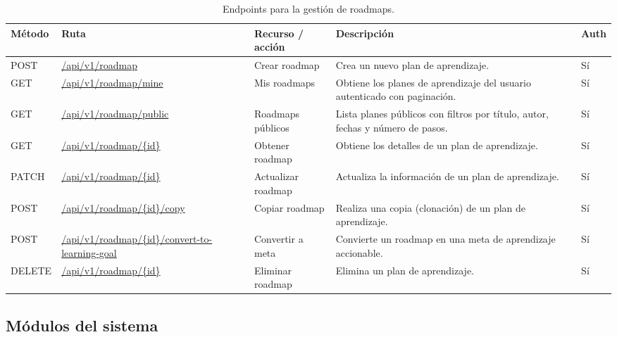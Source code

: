 \begin{table}[H]
\centering
\footnotesize
\setlength{\tabcolsep}{4pt}
\renewcommand{\arraystretch}{1.25}
\begin{tabular}{|p{1.4cm}|p{4.1cm}|p{3.2cm}|p{5.8cm}|p{1cm}|}
\hline
\textbf{Método} & \textbf{Ruta} & \textbf{Recurso / acción} &
\textbf{Descripción} & \textbf{Auth} \\
\hline

POST & \url{/api/v1/roadmap} & Crear roadmap &
Crea un nuevo plan de aprendizaje. &
Sí \\
\hline

GET & \url{/api/v1/roadmap/mine} & Mis roadmaps &
Obtiene los planes de aprendizaje del usuario autenticado con paginación. &
Sí \\
\hline

GET & \url{/api/v1/roadmap/public} & Roadmaps públicos &
Lista planes públicos con filtros por título, autor, fechas y número de pasos. &
Sí \\
\hline

GET & \url{/api/v1/roadmap/{id}} & Obtener roadmap &
Obtiene los detalles de un plan de aprendizaje. &
Sí \\
\hline

PATCH & \url{/api/v1/roadmap/{id}} & Actualizar roadmap &
Actualiza la información de un plan de aprendizaje. &
Sí \\
\hline

POST & \url{/api/v1/roadmap/{id}/copy} & Copiar roadmap &
Realiza una copia (clonación) de un plan de aprendizaje. &
Sí \\
\hline

POST & \url{/api/v1/roadmap/{id}/convert-to-learning-goal} & Convertir a meta &
Convierte un roadmap en una meta de aprendizaje accionable. &
Sí \\
\hline

DELETE & \url{/api/v1/roadmap/{id}} & Eliminar roadmap &
Elimina un plan de aprendizaje. &
Sí \\
\hline

\end{tabular}
\caption{Endpoints para la gestión de roadmaps.}
\end{table}

\subsection*{Módulos del sistema}


